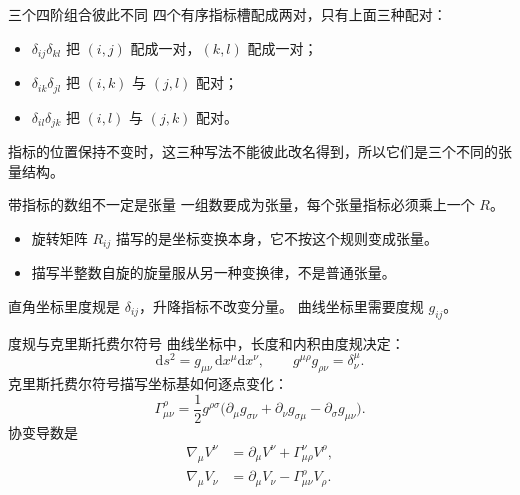 \documentclass[fontset=windows, chinese, 10pt, xcolor=dvipsnames]{beamer}
\begin{document}
\begin{frame}{三个四阶组合彼此不同}
  四个有序指标槽配成两对，只有上面三种配对：
  \begin{itemize}
    \item $\delta_{ij}\delta_{kl}$ 把 $(i,j)$ 配成一对，$(k,l)$ 配成一对；
    \item $\delta_{ik}\delta_{jl}$ 把 $(i,k)$ 与 $(j,l)$ 配对；
    \item $\delta_{il}\delta_{jk}$ 把 $(i,l)$ 与 $(j,k)$ 配对。
  \end{itemize}
  指标的位置保持不变时，这三种写法不能彼此改名得到，所以它们是三个不同的张量结构。
\end{frame}

\begin{frame}{带指标的数组不一定是张量}
  一组数要成为张量，每个张量指标必须乘上一个 $R$。
  \begin{itemize}
    \item 旋转矩阵 $R_{ij}$ 描写的是坐标变换本身，它不按这个规则变成张量。
    \item 描写半整数自旋的旋量服从另一种变换律，不是普通张量。
  \end{itemize}
  直角坐标里度规是 $\delta_{ij}$，升降指标不改变分量。
  曲线坐标里需要度规 $g_{ij}$。
\end{frame}

\begin{frame}{度规与克里斯托费尔符号}
  曲线坐标中，长度和内积由度规决定：
  \begin{equation*}
    \mathrm{d}s^2=g_{\mu\nu}\,\mathrm{d}x^\mu\mathrm{d}x^\nu,
    \qquad
    g^{\mu\rho}g_{\rho\nu}=\delta^\mu_{\nu}.
  \end{equation*}
  克里斯托费尔符号描写坐标基如何逐点变化：
  \begin{equation*}
    \Gamma^{\rho}_{\mu\nu}
    =\frac12 g^{\rho\sigma}
    \bigl(
      \partial_\mu g_{\sigma\nu}
      +\partial_\nu g_{\sigma\mu}
      -\partial_\sigma g_{\mu\nu}
    \bigr).
  \end{equation*}
  协变导数是
  \begin{align*}
    \nabla_\mu V^\nu
    &=\partial_\mu V^\nu+\Gamma^\nu_{\mu\rho}V^\rho,\\
    \nabla_\mu V_\nu
    &=\partial_\mu V_\nu-\Gamma^\rho_{\mu\nu}V_\rho.
  \end{align*}
\end{frame}
\end{document}
